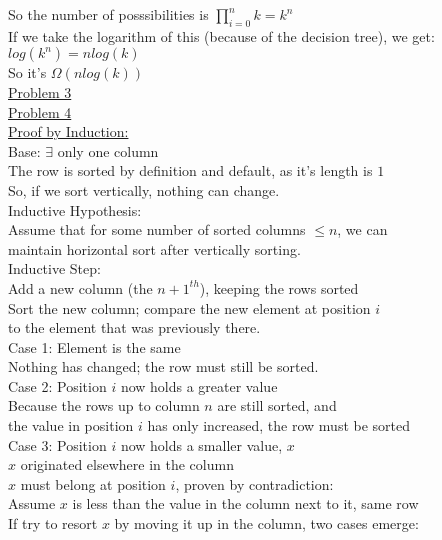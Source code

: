 \documentclass[12pt]{article}
\begin{document}
So the number of posssibilities is $\prod_{i = 0}^{n} k = k^n$\\
If we take the logarithm of this (because of the decision tree), we get:\\
\indent $log(k^n) = nlog(k)$\\
So it's $\Omega(nlog(k))$\\
\underline{Problem 3}\\
\underline{Problem 4}\\
\underline{Proof by Induction:}\\
Base: $\exists$ only one column\\
\indent The row is sorted by definition and default, as it's length is $1$\\
\indent So, if we sort vertically, nothing can change.\\
Inductive Hypothesis: \\
\indent Assume that for some number of sorted columns $\leq n$, we can\\
\indent\indent maintain horizontal sort after vertically sorting.\\
Inductive Step:\\
\indent Add a new column (the $n+1^{th}$), keeping the rows sorted\\
\indent Sort the new column; compare the new element at position $i$\\
\indent\indent to the element that was previously there.\\
\indent Case 1: Element is the same\\
\indent\indent Nothing has changed; the row must still be sorted.\\
\indent Case 2: Position $i$ now holds a greater value\\
\indent\indent Because the rows up to column $n$ are still sorted, and\\ 
\indent\indent\indent the value in position $i$ has only increased, the row must be sorted\\
\indent Case 3: Position $i$ now holds a smaller value, $x$\\
\indent\indent $x$ originated elsewhere in the column\\
\indent\indent $x$ must belong at position $i$, proven by contradiction:\\
\indent\indent\indent Assume $x$ is less than the value in the column next to it, same row\\
\indent\indent\indent If try to resort $x$ by moving it up in the column, two cases emerge:\\
\end{document}
